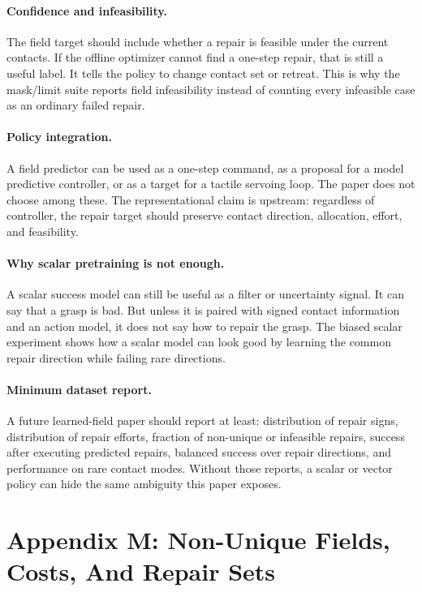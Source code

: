 \documentclass{article}
\begin{document}
\paragraph{Confidence and infeasibility.}
The field target should include whether a repair is feasible under the current contacts. If the offline optimizer cannot find a one-step repair, that is still a useful label. It tells the policy to change contact set or retreat. This is why the mask/limit suite reports field infeasibility instead of counting every infeasible case as an ordinary failed repair.

\paragraph{Policy integration.}
A field predictor can be used as a one-step command, as a proposal for a model predictive controller, or as a target for a tactile servoing loop. The paper does not choose among these. The representational claim is upstream: regardless of controller, the repair target should preserve contact direction, allocation, effort, and feasibility.

\paragraph{Why scalar pretraining is not enough.}
A scalar success model can still be useful as a filter or uncertainty signal. It can say that a grasp is bad. But unless it is paired with signed contact information and an action model, it does not say how to repair the grasp. The biased scalar experiment shows how a scalar model can look good by learning the common repair direction while failing rare directions.

\paragraph{Minimum dataset report.}
A future learned-field paper should report at least: distribution of repair signs, distribution of repair efforts, fraction of non-unique or infeasible repairs, success after executing predicted repairs, balanced success over repair directions, and performance on rare contact modes. Without those reports, a scalar or vector policy can hide the same ambiguity this paper exposes.

\clearpage
\section{Appendix M: Non-Unique Fields, Costs, And Repair Sets}
\end{document}
